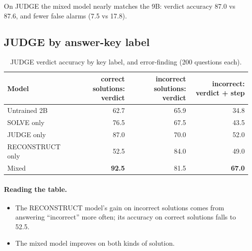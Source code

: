 \documentclass[10pt,a4paper]{article}
\begin{document}
\noindent On JUDGE the mixed model nearly matches the 9B: verdict accuracy 87.0 vs 87.6, and fewer false alarms
(7.5 vs 17.8).

\subsection{JUDGE by answer-key label}
\begin{table}[H]
\centering\small
\caption{JUDGE verdict accuracy by key label, and error-finding (200 questions each).}
\begin{tabular}{lrrr}
\toprule
Model & correct solutions: verdict & incorrect solutions: verdict & incorrect: verdict + step\\
\midrule
Untrained 2B & 62.7 & 65.9 & 34.8\\
SOLVE only & 76.5 & 67.5 & 43.5\\
JUDGE only & 87.0 & 70.0 & 52.0\\
RECONSTRUCT only & 52.5 & 84.0 & 49.0\\
Mixed & \textbf{92.5} & 81.5 & \textbf{67.0}\\
\bottomrule
\end{tabular}
\end{table}

\paragraph{Reading the table.}
\begin{itemize}
\item The RECONSTRUCT model's gain on incorrect solutions comes from answering ``incorrect'' more often; its accuracy
      on correct solutions falls to 52.5.
\item The mixed model improves on both kinds of solution.
\end{itemize}
\end{document}
